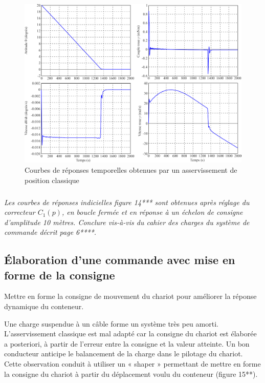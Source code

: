 \documentclass[10pt,fleqn]{article} %
\begin{document}
\begin{figure}[H]
\centering
\includegraphics[width=\linewidth]{images/fig_14}
\caption{Courbes de réponses temporelles obtenues par un asservissement de position classique \label{fig_14}}
\end{figure}

\subparagraph{\label{q21}}\textit{Les courbes de réponses indicielles figure 14*** sont obtenues après réglage du correcteur $C_1(p)$, en boucle
fermée et en réponse à un échelon de consigne d’amplitude 10 mètres. Conclure vis-à-vis du cahier des charges
du système de commande décrit page 6****.}

\subsection{Élaboration d’une commande avec mise en forme de la consigne}

\begin{obj}
Mettre en forme la consigne de mouvement du chariot pour améliorer la réponse dynamique du
conteneur.
\end{obj}

Une charge suspendue à un câble forme un système très peu amorti. L’asservissement classique est mal adapté
car la consigne du chariot est élaborée a posteriori, à partir de l’erreur entre la consigne et la valeur atteinte.
Un bon conducteur anticipe le balancement de la charge dans le pilotage du chariot. Cette observation conduit
à utiliser un « shaper » permettant de mettre en forme la consigne du chariot à partir du déplacement voulu du
conteneur (figure 15**).
\end{document}
